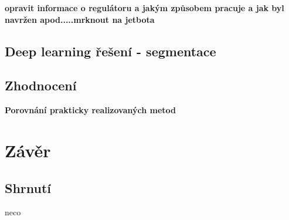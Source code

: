 \documentclass[czech, bc, kky, he, iso690alph]{fasthesis}
\begin{document}
                \textbf{opravit informace o regulátoru a jakým způsobem pracuje a jak byl navržen apod.....mrknout na jetbota}
        \section{Deep learning řešení - segmentace}
        \section{Zhodnocení}
        	\textbf{Porovnání prakticky realizovaných metod}
    \chapter{Závěr}
        \section{Shrnutí}
            neco
                    
    \backmatter
    \printbibliography
    \listoffigures
    \listoftables
    \listoflistings
    \backpage
\end{document}
